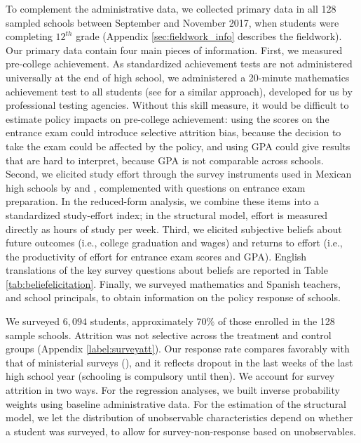 To complement the administrative data, we collected primary data in all 128 sampled schools between September and November 2017, when students were completing $12^{th}$ grade (Appendix \ref{sec:fieldwork_info} describes the fieldwork). Our primary data contain four main pieces of information. First, we measured pre-college achievement. As standardized achievement tests are not administered universally at the end of high school, we administered a 20-minute mathematics achievement test to all students (see \citealp{behrman2015aligning} for a similar approach), developed for us by professional testing agencies. Without this skill measure, it would be difficult to estimate policy impacts on pre-college achievement: using the scores on the entrance exam could introduce selective attrition bias, because the decision to take the exam could be affected by the policy, and using GPA could give results that are hard to interpret, because GPA is not comparable across schools. Second, we elicited study effort through the survey instruments used in Mexican high schools by \citealp{behrman2015aligning} and \citealp{todd2018accounting}, complemented with questions on entrance exam preparation. In the reduced-form analysis, we combine these items into a standardized study-effort index; in the structural model, effort is measured directly as hours of study per week. Third, we elicited subjective beliefs about future outcomes (i.e., college graduation and wages) and returns to effort (i.e., the productivity of effort for entrance exam scores and GPA). English translations of the key survey questions about beliefs are reported in Table \ref{tab:beliefelicitation}. Finally, we surveyed mathematics and Spanish teachers, and school principals, to obtain information on the policy response of schools.\par 

We surveyed $6,094$ students, approximately $70\%$ of those enrolled in the 128 sample schools. Attrition was not selective across the treatment and control groups (Appendix \ref{label:surveyatt}). Our response rate compares favorably with that of ministerial surveys (\citealp{mineduc2018pilot,mineduc2017impl}), and it reflects dropout in the last weeks of the last high school year (schooling is compulsory until then). We account for survey attrition in two ways. For the regression analyses, we built inverse probability weights using baseline administrative data. For the estimation of the structural model, we let the distribution of unobservable characteristics depend on whether a student was surveyed, to allow for survey-non-response based on unobservables. \par  

